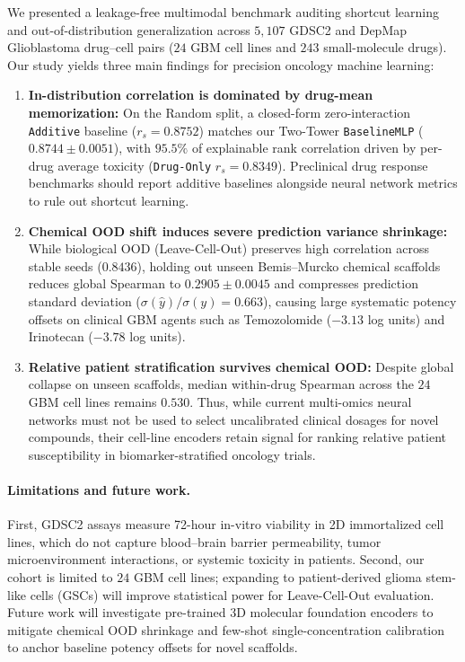 \documentclass{article}
\begin{document}
We presented a leakage-free multimodal benchmark auditing shortcut learning and out-of-distribution generalization across $5,107$ GDSC2 and DepMap Glioblastoma drug--cell pairs ($24$ GBM cell lines and $243$ small-molecule drugs). Our study yields three main findings for precision oncology machine learning:
\begin{enumerate}
  \setlength{\itemsep}{1.5pt}\setlength{\parskip}{0pt}\setlength{\topsep}{2pt}
  \item \textbf{In-distribution correlation is dominated by drug-mean memorization:} On the Random split, a closed-form zero-interaction \texttt{Additive} baseline ($r_s = 0.8752$) matches our Two-Tower \texttt{BaselineMLP} ($0.8744 \pm 0.0051$), with $95.5\%$ of explainable rank correlation driven by per-drug average toxicity (\texttt{Drug-Only} $r_s = 0.8349$). Preclinical drug response benchmarks should report additive baselines alongside neural network metrics to rule out shortcut learning.
  \item \textbf{Chemical OOD shift induces severe prediction variance shrinkage:} While biological OOD (Leave-Cell-Out) preserves high correlation across stable seeds ($0.8436$), holding out unseen Bemis--Murcko chemical scaffolds reduces global Spearman to $0.2905 \pm 0.0045$ and compresses prediction standard deviation ($\sigma(\hat{y})/\sigma(y) = 0.663$), causing large systematic potency offsets on clinical GBM agents such as Temozolomide ($-3.13$ log units) and Irinotecan ($-3.78$ log units).
  \item \textbf{Relative patient stratification survives chemical OOD:} Despite global collapse on unseen scaffolds, median within-drug Spearman across the $24$ GBM cell lines remains $0.530$. Thus, while current multi-omics neural networks must not be used to select uncalibrated clinical dosages for novel compounds, their cell-line encoders retain signal for ranking relative patient susceptibility in biomarker-stratified oncology trials.
\end{enumerate}

\paragraph{Limitations and future work.}
First, GDSC2 assays measure 72-hour in-vitro viability in 2D immortalized cell lines, which do not capture blood--brain barrier permeability, tumor microenvironment interactions, or systemic toxicity in patients. Second, our cohort is limited to $24$ GBM cell lines; expanding to patient-derived glioma stem-like cells (GSCs) will improve statistical power for Leave-Cell-Out evaluation. Future work will investigate pre-trained 3D molecular foundation encoders to mitigate chemical OOD shrinkage and few-shot single-concentration calibration to anchor baseline potency offsets for novel scaffolds.
\end{document}

